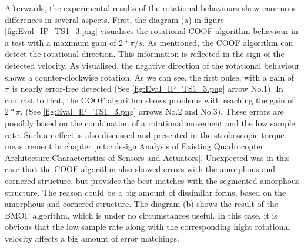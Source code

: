 Afterwards, the experimental results of the rotational behaviours show enormous differences in several aspects. First, the diagram (a) in
figure \ref{fig:Eval_IP_TS1_3.png} visualises the rotational \gls{COOF} algorithm behaviour in a test with a maximum gain of 
 \ensuremath{2*\pi/s}. As mentioned, the \gls{COOF} algorithm can detect the rotational direction. This information is reflected in the sign of the detected velocity. As visualised, the negative direction of the rotational behaviour shows a counter-clockwise rotation. As we can see, the first pulse, with a gain of \ensuremath{\pi} is nearly error-free detected (See \ref{fig:Eval_IP_TS1_3.png} arrow No.1). In contrast to that, the \gls{COOF} algorithm shows problems with reaching the gain of \ensuremath{2*\pi}, 
(See \ref{fig:Eval_IP_TS1_3.png} arrows No.2 and No.3). These errors are possibly based on the combination of a rotational movement and the low sample rate. Such an effect is also discussed and presented in the stroboscopic torque measurement in chapter 
\ref{mt:c:design:Analysis of Existing Quadrocopter Architecture:Characteristics of Sensors and Actuators}. Unexpected was in this case that the \gls{COOF} algorithm also showed errors with the amorphous and cornered structure, but provides the best matches with the segmented amorphous structure. The reason could be a big amount of dissimilar forms, based on the amorphous and cornered structure. 
The diagram (b) shows the result of the \gls{BMOF} algorithm, which is under no circumstances useful. In this case, it is obvious that the low sample rate along with the corresponding hight rotational velocity affects a big amount of error matchings.


